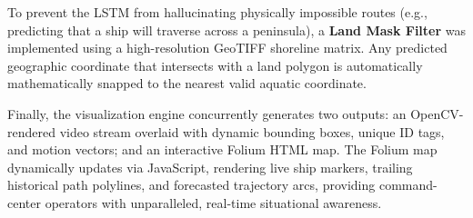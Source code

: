 To prevent the LSTM from hallucinating physically impossible routes (e.g., predicting that a ship will traverse across a peninsula), a \textbf{Land Mask Filter} was implemented using a high-resolution GeoTIFF shoreline matrix. Any predicted geographic coordinate that intersects with a land polygon is automatically mathematically snapped to the nearest valid aquatic coordinate.

Finally, the visualization engine concurrently generates two outputs: an OpenCV-rendered video stream overlaid with dynamic bounding boxes, unique ID tags, and motion vectors; and an interactive Folium HTML map. The Folium map dynamically updates via JavaScript, rendering live ship markers, trailing historical path polylines, and forecasted trajectory arcs, providing command-center operators with unparalleled, real-time situational awareness.